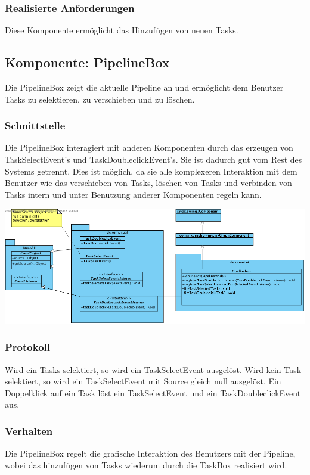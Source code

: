 \documentclass[a4paper,12pt]{scrartcl}
\begin{document}
\subsubsection{Realisierte Anforderungen}
Diese Komponente ermöglicht das Hinzufügen von neuen Tasks.

\subsection{Komponente: PipelineBox}
Die PipelineBox zeigt die aktuelle Pipeline an und ermöglicht dem Benutzer Tasks zu selektieren, zu verschieben und zu löschen. 
\subsubsection{Schnittstelle}
Die PipelineBox interagiert mit anderen Komponenten durch das erzeugen von TaskSelectEvent's und TaskDoubleclickEvent's.
Sie ist dadurch gut vom Rest des Systems getrennt. Dies ist möglich, da sie alle komplexeren Interaktion mit dem Benutzer wie das verschieben von Tasks, löschen von Tasks und verbinden von Tasks intern und unter Benutzung anderer Komponenten regeln kann.
\begin{center}
\includegraphics[width=17cm]{Schnittstelle_PipelineBox.png}
\end{center}
\subsubsection{Protokoll}
Wird ein Tasks selektiert, so wird ein TaskSelectEvent ausgelöst. Wird kein Task selektiert, so wird ein TaskSelectEvent mit Source gleich null ausgelöst. Ein Doppelklick auf ein Task löst ein TaskSelectEvent und ein TaskDoubleclickEvent aus.
\subsubsection{Verhalten}
Die PipelineBox regelt die grafische Interaktion des Benutzers mit der Pipeline, wobei das hinzufügen von Tasks wiederum durch die TaskBox realisiert wird.
\end{document}
